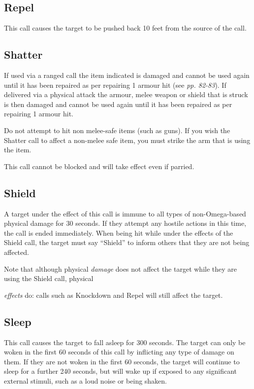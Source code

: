 \documentclass{scrbook}
\begin{document}
\subsection{Repel}

This call causes the target to be pushed back 10 feet from the source of the call.

\subsection{Shatter}

If used via a ranged call the item indicated is damaged and cannot be used again until it has been repaired as per repairing 1 armour hit (see \textit{pp. 82-83}). If delivered via a physical attack the armour, melee weapon or shield that is struck is then damaged and cannot be used again until it has been repaired as per repairing 1 armour hit.

Do not attempt to hit non melee-safe items (such as guns). If you wish the Shatter call to affect a non-melee safe item, you must strike the arm that is using the item.

This call cannot be blocked and will take effect even if parried.

\subsection{Shield}

A target under the effect of this call is immune to all types of non-Omega-based physical damage for 30 seconds. If they attempt any hostile actions in this time, the call is ended immediately. When being hit while under the effects of the Shield call, the target must say ``Shield'' to inform others that they are not being affected.

Note that although physical \textit{damage} does not affect the target while they are using the Shield call, physical

\textit{effects} do: calls such as Knockdown and Repel will still affect the target.

\subsection{Sleep}

This call causes the target to fall asleep for 300 seconds. The target can only be woken in the first 60 seconds of this call by inflicting any type of damage on them. If they are not woken in the first 60 seconds, the target will continue to sleep for a further 240 seconds, but will wake up if exposed to any significant external stimuli, such as a loud noise or being shaken.
\end{document}
